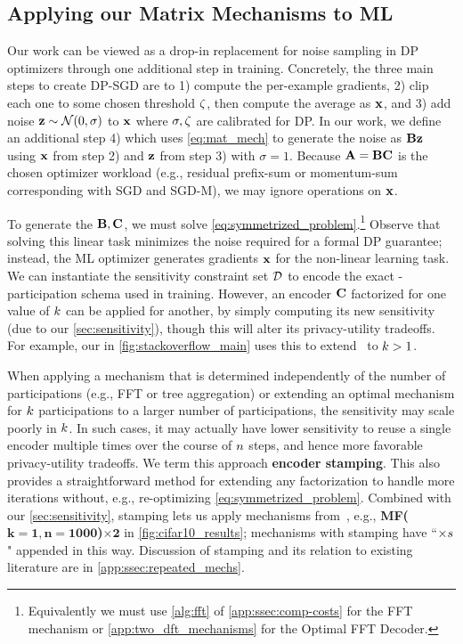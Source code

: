 \documentclass{article} %
\theoremstyle{named}
\begin{document}
\subsection{Applying our Matrix Mechanisms to ML}\label{ssec:empirical-pragmatics}
Our work can be viewed as a drop-in replacement for noise sampling in DP optimizers through one additional step in training. Concretely, the three main steps to create DP-SGD are to 1) compute the per-example gradients, 2) clip each one to some chosen threshold $\zeta$, then compute the average as $\mathbf{x}$, and 3) add noise $\mathbf{z} \sim \mathcal{N}(0, \sigma)$ to $\mathbf{x}$ where $\sigma,\zeta$ are calibrated for DP. In our work, we define an additional step 4) which uses \cref{eq:mat_mech} to generate the noise as $\mathbf{B}\mathbf{z}$ using $\mathbf{x}$ from step 2) and $\mathbf{z}$ from step 3) with $\sigma=1$. 
Because $\mathbf{A}=\mathbf{B}\mathbf{C}$ is the chosen optimizer workload (e.g., residual prefix-sum or momentum-sum corresponding with SGD and SGD-M), we may ignore operations on $\mathbf{x}$.

To generate the $\mathbf{B},\mathbf{C}$, we must solve  \cref{eq:symmetrized_problem}.\footnote{Equivalently we must use \cref{alg:fft} of \cref{app:ssec:comp-costs} for the FFT mechanism or \cref{app:two_dft_mechanisms} for the Optimal FFT Decoder.} Observe that solving this linear task minimizes the noise required for a formal DP guarantee; instead, the ML optimizer generates gradients $\mathbf{x}$ for the non-linear learning task.
We can instantiate the sensitivity constraint set $\mathcal{D}$ to encode the exact \multiepoch-participation schema used in training. However, an encoder $\mathbf{C}$ factorized for one value of $k$ can be applied for another, by simply computing its new sensitivity (due to our \cref{sec:sensitivity}), though this will alter its privacy-utility tradeoffs. For example, 
our \OneEpochSix in \cref{fig:stackoverflow_main} uses this to extend~\citet{denisov22matfact} to $k>1$.

When applying a mechanism that is determined independently of the number of participations (e.g., FFT or tree aggregation) or extending an optimal mechanism for $k$ participations to a larger number of participations, the sensitivity may scale poorly in $k$. In such cases, it may actually have lower sensitivity to reuse a single encoder multiple times over the course of $n$ steps, and hence more favorable privacy-utility tradeoffs. We term this approach \textbf{encoder stamping}. This also provides a straightforward method for extending any factorization to handle more iterations without, e.g., re-optimizing \cref{eq:symmetrized_problem}. Combined with our \cref{sec:sensitivity}, stamping lets us apply mechanisms from~\citet{denisov22matfact}, e.g., \textbf{MF(}$\mathbf{k{=}1,n{=}1000}$\textbf{)}$\mathbf{\times2}$ in \cref{fig:cifar10_results}; mechanisms with stamping have ``$\times s$" appended in this way. Discussion of stamping and its relation to existing literature are in \cref{app:ssec:repeated_mechs}. 
\end{document}
